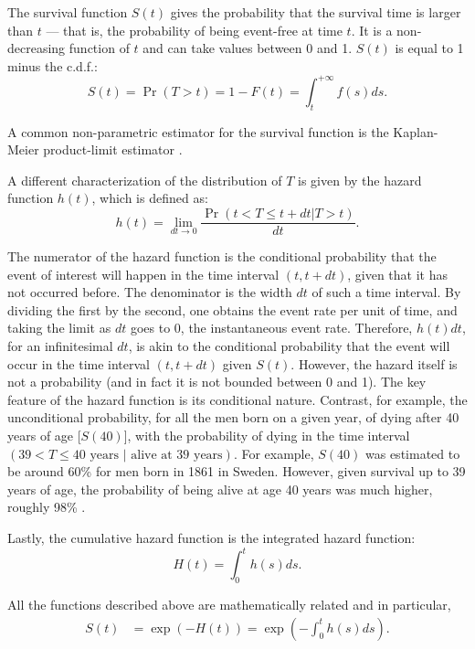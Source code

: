 The survival function $S(t)$ gives the probability that the survival time is larger than $t$ --- that is, the probability of being event-free at time $t$. It is a non-decreasing function of $t$ and can take values between 0 and 1. $S(t)$ is equal to 1 minus the c.d.f.:
\begin{equation}
S(t) = \Pr(T > t) = 1 - F(t) = \int_t^{+\infty}f(s)ds.
\label{eq:survivalfunction}
\end{equation}

A common non-parametric estimator for the survival function is the Kaplan-Meier product-limit estimator \citep{kaplan_nonparametric_1958}.

A different characterization of the distribution of $T$ is given by the hazard function $h(t)$, which is defined as:
\begin{equation}
h(t) = \lim_{dt \rightarrow 0} \frac{\Pr(t < T \le t + dt | T > t)}{dt}.
\label{eq:hazardrate}
\end{equation} 

The numerator of the hazard function is the conditional probability that the event of interest will happen in the time interval $(t,t+dt)$, given that it has not occurred before. The denominator is the width $dt$ of such a time interval. By dividing the first by the second, one obtains the event rate per unit of time, and taking the limit as $dt$ goes to 0, the instantaneous event rate. Therefore, $h(t)dt$, for an infinitesimal $dt$, is akin to the conditional probability that the event will occur in the time interval $(t,t+dt)$ given $S(t)$. However, the hazard itself is not a probability (and in fact it is not bounded between 0 and 1). The key feature of the hazard function is its conditional nature. Contrast, for example, the unconditional probability, for all the men born on a given year, of dying after 40 years of age [$S(40)$], with the probability of dying in the time interval $(39 < T \le 40 \textrm{ years } | \textrm{ alive at 39 years})$. For example, $S(40)$ was estimated to be around 60\% for men born in 1861 in Sweden. However, given survival up to 39 years of age, the probability of being alive at age 40 years was much higher, roughly 98\% \citep{scb_cohort_2010}.

Lastly, the cumulative hazard function is the integrated hazard function:
\begin{equation*}
H(t)=\int_0^t h(s)ds.
\end{equation*}

All the functions described above are mathematically related and in particular,
\begin{align}
S(t) &= \exp\left(-H(t)\right) = \exp\left(-\int_0^t h(s)ds\right). \label{eq:SfromH}
\end{align}

